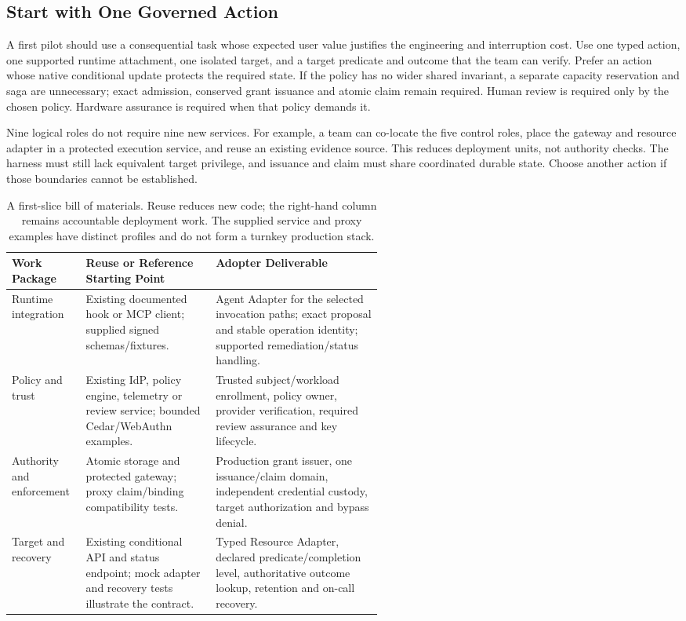 \subsection{Start with One Governed Action}
\label{sec:first-adoption-slice}

A first pilot should use a consequential task whose expected user value
justifies the engineering and interruption cost. Use one typed action, one supported runtime attachment,
one isolated target, and a target predicate and outcome that the team can verify.
Prefer an action whose native conditional update protects the required state.
If the policy has no wider shared invariant, a separate capacity reservation
and saga are unnecessary; exact admission, conserved grant issuance and atomic
claim remain required. Human review is required only by the chosen policy.
Hardware assurance is required when that policy demands it.

Nine logical roles do not require nine new services. For example, a team can
co-locate the five control roles, place the gateway and resource adapter in a
protected execution service, and reuse an existing evidence source. This reduces
deployment units, not authority checks. The harness must still lack equivalent
target privilege, and issuance and claim must share coordinated durable state.
Choose another action if those boundaries cannot be established.

\small
\begin{table}[!ht]
\begin{tabularx}{\linewidth}{@{}L{0.20\linewidth}L{0.35\linewidth}X@{}}
\toprule
\textbf{Work Package} & \textbf{Reuse or Reference Starting Point} & \textbf{Adopter Deliverable}\\
\midrule
Runtime integration & Existing documented hook or MCP client; supplied signed schemas/fixtures. & Agent Adapter for the selected invocation paths; exact proposal and stable operation identity; supported remediation/status handling.\\
Policy and trust & Existing IdP, policy engine, telemetry or review service; bounded Cedar/WebAuthn examples. & Trusted subject/workload enrollment, policy owner, provider verification, required review assurance and key lifecycle.\\
Authority and enforcement & Atomic storage and protected gateway; proxy claim/binding compatibility tests. & Production grant issuer, one issuance/claim domain, independent credential custody, target authorization and bypass denial.\\
Target and recovery & Existing conditional API and status endpoint; mock adapter and recovery tests illustrate the contract. & Typed Resource Adapter, declared predicate/completion level, authoritative outcome lookup, retention and on-call recovery.\\
\bottomrule
\end{tabularx}
\caption{A first-slice bill of materials. Reuse reduces new code; the right-hand
column remains accountable deployment work. The supplied service and proxy
examples have distinct profiles and do not form a turnkey production stack.}
\label{tab:adoption-work-packages}
\end{table}
\normalsize

